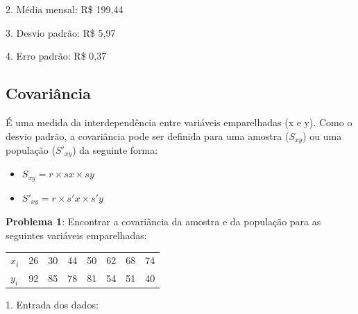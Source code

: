 2. Média mensal: R\$ 199,44 \\
         

3. Desvio padrão: R\$ 5,97 \\
 

4. Erro padrão: R\$ 0,37 \\
     \keystroke{$\div$}

\subsection*{Covariância}
É uma medida da interdependência entre variáveis emparelhadas (x e y). Como o desvio padrão, a covariância pode ser definida para uma amostra ($S_{xy}$) ou uma população ($S'_{xy}$) da seguinte forma: \vspace{-1em}
\begin{itemize} 
	\item $S_{xy} = r \times sx \times sy$
	\item $S'_{xy} = r \times s'x \times s'y$
\end{itemize} 

\textbf{Problema 1}: Encontrar a covariância da amostra e da população para as seguintes variáveis emparelhadas:
\begin{table}[H]
	\centering 
	\begin{tabular}{l | r | r | r | r | r | r | r }
		$x_i$ & 26 & 30 & 44 & 50 & 62 & 68 & 74 \\
		$y_i$ & 92 & 85 & 78 & 81 & 54 & 51 & 40 \\
	\end{tabular}
\end{table}

1. Entrada dos dados: \\
  \\
     \keystroke{$\sum+$} \\
     \keystroke{$\sum+$} \\
     \keystroke{$\sum+$} \\
     \keystroke{$\sum+$} \\
     \keystroke{$\sum+$} \\
     \keystroke{$\sum+$} \\
     \keystroke{$\sum+$}

